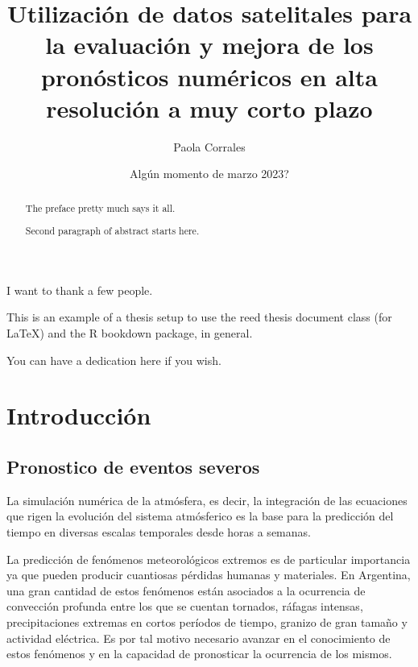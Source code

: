 \documentclass[12pt,twoside]{reedthesis}
\title{Utilización de datos satelitales para la evaluación y mejora de los pronósticos numéricos en alta resolución a muy corto plazo}
\author{Paola Corrales}
\date{Algún momento de marzo 2023?}
\begin{document}
  \maketitle

\frontmatter %
\pagestyle{empty} %
  \begin{acknowledgements}
    I want to thank a few people.
  \end{acknowledgements}
  \begin{preface}
    This is an example of a thesis setup to use the reed thesis document class
    (for LaTeX) and the R bookdown package, in general.
  \end{preface}
  \hypersetup{linkcolor=black}
  \setcounter{secnumdepth}{2}
  \setcounter{tocdepth}{2}
  \tableofcontents

  \listoftables

  \listoffigures
  \begin{abstract}
    The preface pretty much says it all.
    
    \par
    
    Second paragraph of abstract starts here.
  \end{abstract}
  \begin{dedication}
    You can have a dedication here if you wish.
  \end{dedication}
\mainmatter %
\pagestyle{fancyplain} %

\hypertarget{introducciuxf3n}{%
\chapter*{Introducción}\label{introducciuxf3n}}

\hypertarget{pronostico-de-eventos-severos}{%
\section{Pronostico de eventos severos}\label{pronostico-de-eventos-severos}}

La simulación numérica de la atmósfera, es decir, la integración de las ecuaciones que rigen la evolución del sistema atmósferico es la base para la predicción del tiempo en diversas escalas temporales desde horas a semanas.

La predicción de fenómenos meteorológicos extremos es de particular importancia ya que pueden producir cuantiosas pérdidas humanas y materiales. En Argentina, una gran cantidad de estos fenómenos están asociados a la ocurrencia de convección profunda entre los que se cuentan tornados, ráfagas intensas, precipitaciones extremas en cortos períodos de tiempo, granizo de gran tamaño y actividad eléctrica. Es por tal motivo necesario avanzar en el conocimiento de estos fenómenos y en la capacidad de pronosticar la ocurrencia de los mismos.
\end{document}
